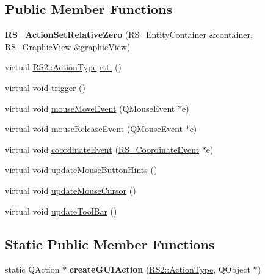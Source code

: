 \subsection*{Public Member Functions}
\begin{DoxyCompactItemize}
\item 
\hypertarget{classRS__ActionSetRelativeZero_a208ed611c3ff60b37379f3cc49620ebf}{{\bfseries R\-S\-\_\-\-Action\-Set\-Relative\-Zero} (\hyperlink{classRS__EntityContainer}{R\-S\-\_\-\-Entity\-Container} \&container, \hyperlink{classRS__GraphicView}{R\-S\-\_\-\-Graphic\-View} \&graphic\-View)}\label{classRS__ActionSetRelativeZero_a208ed611c3ff60b37379f3cc49620ebf}

\item 
virtual \hyperlink{classRS2_afe3523e0bc41fd637b892321cfc4b9d7}{R\-S2\-::\-Action\-Type} \hyperlink{classRS__ActionSetRelativeZero_a8bb461c40ed0447aacdf402d135bc5ad}{rtti} ()
\item 
virtual void \hyperlink{classRS__ActionSetRelativeZero_a23b54b6e4fb1ed518584e962082e9890}{trigger} ()
\item 
virtual void \hyperlink{classRS__ActionSetRelativeZero_adcc61b258cfd1d427f662d0664ff4c0f}{mouse\-Move\-Event} (Q\-Mouse\-Event $\ast$e)
\item 
virtual void \hyperlink{classRS__ActionSetRelativeZero_a6b268e70f83cd929c9888bfef78cb955}{mouse\-Release\-Event} (Q\-Mouse\-Event $\ast$e)
\item 
virtual void \hyperlink{classRS__ActionSetRelativeZero_ae20d9afe8b0275bc214a5fafbd3c04a5}{coordinate\-Event} (\hyperlink{classRS__CoordinateEvent}{R\-S\-\_\-\-Coordinate\-Event} $\ast$e)
\item 
virtual void \hyperlink{classRS__ActionSetRelativeZero_a6ff76392d9564a197c8b3f6af3eda592}{update\-Mouse\-Button\-Hints} ()
\item 
virtual void \hyperlink{classRS__ActionSetRelativeZero_a80c98126bb667428dd2b844e19a04bfe}{update\-Mouse\-Cursor} ()
\item 
virtual void \hyperlink{classRS__ActionSetRelativeZero_a4df982f22e615e897ab02d08103c126f}{update\-Tool\-Bar} ()
\end{DoxyCompactItemize}
\subsection*{Static Public Member Functions}
\begin{DoxyCompactItemize}
\item 
\hypertarget{classRS__ActionSetRelativeZero_aa40fa8a568a4f3b07a5c03d2bac57726}{static Q\-Action $\ast$ {\bfseries create\-G\-U\-I\-Action} (\hyperlink{classRS2_afe3523e0bc41fd637b892321cfc4b9d7}{R\-S2\-::\-Action\-Type}, Q\-Object $\ast$)}\label{classRS__ActionSetRelativeZero_aa40fa8a568a4f3b07a5c03d2bac57726}

\end{DoxyCompactItemize}
